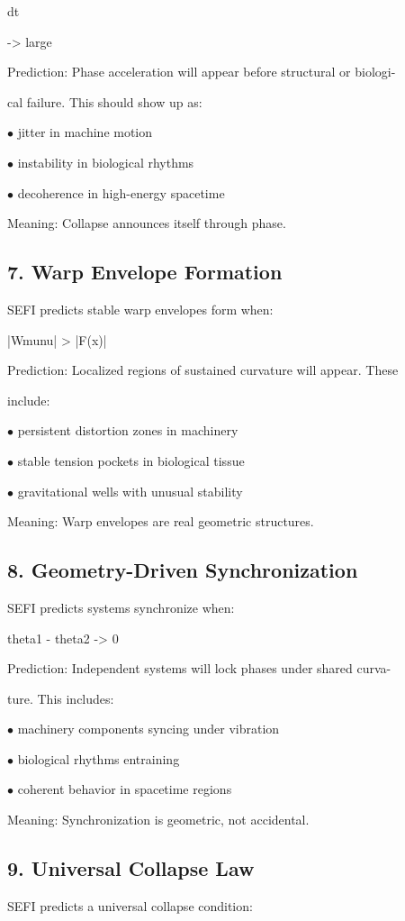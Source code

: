 \documentclass[10pt]{article}
\begin{document}
dt

-> large

Prediction: Phase acceleration will appear before structural or biologi-

cal failure. This should show up as:

\noindent $\bullet$ jitter in machine motion

\noindent $\bullet$ instability in biological rhythms

\noindent $\bullet$ decoherence in high-energy spacetime

Meaning: Collapse announces itself through phase.


\subsection*{7. Warp Envelope Formation}
SEFI predicts stable warp envelopes form when:

|Wmunu| > |F(x)|

Prediction: Localized regions of sustained curvature will appear. These

include:

\noindent $\bullet$ persistent distortion zones in machinery

\noindent $\bullet$ stable tension pockets in biological tissue

\noindent $\bullet$ gravitational wells with unusual stability

Meaning: Warp envelopes are real geometric structures.

\subsection*{8. Geometry-Driven Synchronization}
SEFI predicts systems synchronize when:

theta1 - theta2 -> 0

Prediction: Independent systems will lock phases under shared curva-

ture. This includes:

\noindent $\bullet$ machinery components syncing under vibration

\noindent $\bullet$ biological rhythms entraining

\noindent $\bullet$ coherent behavior in spacetime regions

Meaning: Synchronization is geometric, not accidental.

\subsection*{9. Universal Collapse Law}
SEFI predicts a universal collapse condition:
\end{document}
